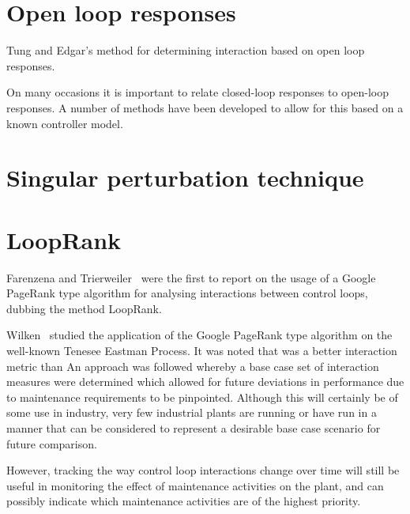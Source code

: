 \documentclass[a4paper]{book}
\begin{document}
\section{Open loop responses}

Tung and Edgar's method for determining interaction based on open loop responses. %

On many occasions it is important to relate closed-loop responses to open-loop responses.
A number of methods have been developed to allow for this based on a known controller model.

\section{Singular perturbation technique}








\section{LoopRank}

Farenzena and Trierweiler~\cite{Farenzena2009} were the first to report on the usage of a Google PageRank type algorithm for analysing interactions between control loops, dubbing the method LoopRank.

Wilken~\cite{Wilken2012} studied the application of the Google PageRank type algorithm on the well-known Tenesee Eastman Process.
It was noted that %
was a better interaction metric than
An approach was followed whereby a base case set of interaction measures were determined which allowed for future deviations in performance due to maintenance requirements to be pinpointed.
Although this will certainly be of some use in industry, very few industrial plants are running or have run in a manner that can be considered to represent a desirable base case scenario for future comparison.

However, tracking the way control loop interactions change over time will still be useful in monitoring the effect of maintenance activities on the plant, and can possibly indicate which maintenance activities are of the highest priority.
\end{document}
